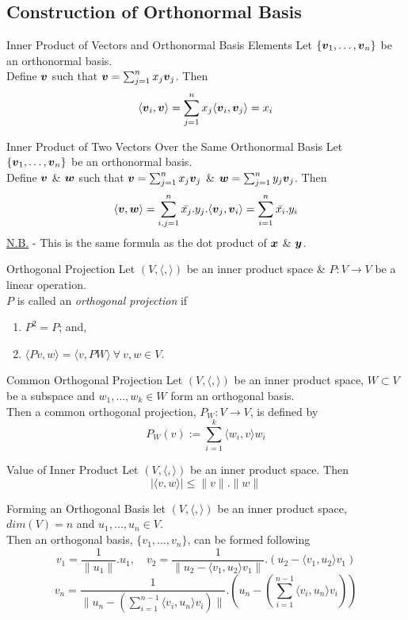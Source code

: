 \documentclass[11pt,a4paper]{article}
\begin{document}
\subsection{Construction of Orthonormal Basis}

\subtitle{Theorem 9.10 - }{Inner Product of Vectors and Orthonormal Basis Elements}
Let $\{\boldsymbol{v}_1, \dots , \boldsymbol{v}_n\}$ be an orthonormal basis.\\
Define $\boldsymbol{v}$ such that $\boldsymbol{v} = \sum_{j=1}^n x_j \boldsymbol{v}_j$. Then\\
$$\langle\boldsymbol{v}_i, \boldsymbol{v}\rangle = \sum_{j=1}^n x_j \langle\boldsymbol{v}_i, \boldsymbol{v}_j \rangle = x_i$$

\subtitle{Theorem 9.11 - }{Inner Product of Two Vectors Over the Same Orthonormal Basis}
Let $\{\boldsymbol{v}_1, \dots , \boldsymbol{v}_n\}$ be an orthonormal basis.\\
Define $\boldsymbol{v}$ \& $\boldsymbol{w}$ such that $\boldsymbol{v} = \sum_{j=1}^n x_j \boldsymbol{v}_j$ \& $\boldsymbol{w} = \sum_{j=1}^n y_j \boldsymbol{v}_j$. Then\\
$$\langle \boldsymbol{v}, \boldsymbol{w} \rangle = \sum_{i,j=1}^n \bar{x_j}.y_j.\langle \boldsymbol{v}_j, \boldsymbol{v}_i \rangle = \sum_{i=1}^n \bar{x_i}.y_i$$
\underline{N.B.} - This is the same formula as the dot product of $\boldsymbol{x}$ \& $\boldsymbol{y}$.\\

\subtitle{Definition 9.12 - }{Orthogonal Projection}
Let $(V, \langle,\rangle)$ be an inner product space \& $P : V \to V$ be a linear operation.\\
$P$ is called an \textit{orthogonal projection} if
\begin{enumerate}[label=\roman*)]
  \item $P^2 = P$; and,
  \item $\langle Pv, w\rangle = \langle v, PW\rangle\ \forall\ v, w \in V$.
\end{enumerate}

\subtitle{Proposition 9.13 - }{Common Orthogonal Projection}
Let $(V, \langle, \rangle)$ be an inner product space, $W \subset V$ be a subspace and $w_1, \dots , w_k \in W$ form an orthogonal basis.\\
Then a common orthogonal projection, $P_W : V \to V$, is defined by
$$P_W(v) := \sum_{i=1}^k \langle w_i, v \rangle w_i$$

\subtitle{Theorem 9.14 - }{Value of Inner Product}
Let $(V, \langle , \rangle)$ be an inner product space. Then
$$|\langle v, w \rangle| \leq \|v\|.\|w\|$$

\subtitle{Theorem 9.15 - }{Forming an Orthogonal Basis}
let $(V, \langle,\rangle)$ be an inner product space, $dim(V) = n$ and $u_1 , \dots , u_n \in V$.\\
Then an orthogonal basis, $\{v_1, \dots , v_n\}$, can be formed following
$$v_1 = \frac{1}{\|u_1\|}.u_1, \quad v_2 = \frac{1}{\|u_2 - \langle v_1, u_2\rangle v_1\|}.(u_2 - \langle v_1, u_2\rangle v_1)$$
$$v_n = \frac{1}{\|u_n - (\sum_{i=1}^{n-1}\langle v_i, u_n\rangle v_i)\|}.\left(u_n - \left(\sum_{i=1}^{n-1}\langle v_i, u_n\rangle v_i\right)\right)$$\\
\end{document}
